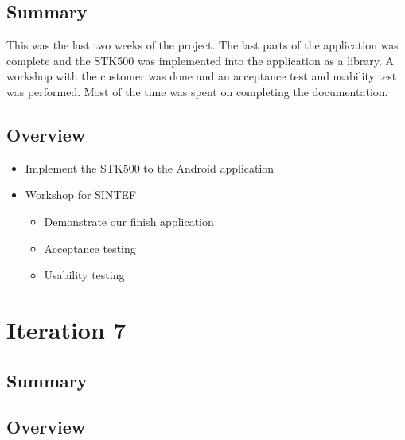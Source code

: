 \subsection{Summary}
	This was the last two weeks of the project. The last parts of the application was complete and the STK500 was implemented into the application as a library.
	A workshop with the customer was done and an acceptance test and usability test was performed. Most of the time was spent on completing the documentation.

\subsection{Overview}
\begin{itemize}
	\item{Implement the STK500 to the Android application}
	\item{Workshop for SINTEF}
		\begin{itemize}
		\item{Demonstrate our finish application}
		\item{Acceptance testing}
		\item{Usability testing}
	\end{itemize}
\end{itemize}

\section{Iteration 7}

\subsection{Summary}

\subsection{Overview}
